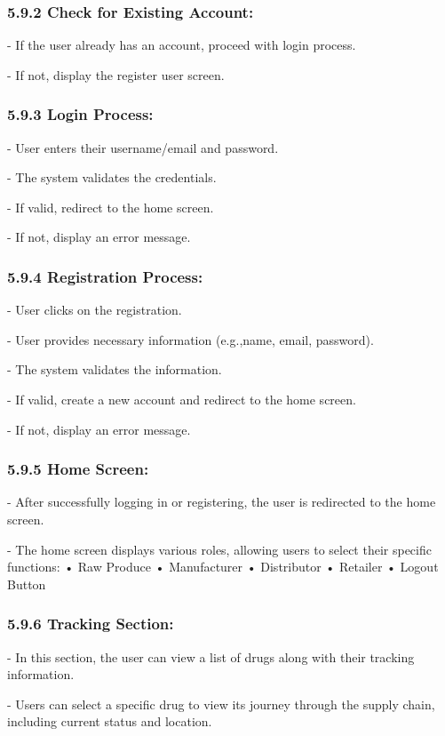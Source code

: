 \documentclass[runningheads]{llncs}
\begin{document}
\subsubsection{5.9.2 Check for Existing Account:}
- If the user already has an account, proceed with login process. 

- If not, display the register user
screen.

\subsubsection{5.9.3 Login Process:}

- User enters their username/email and password.

- The system validates the credentials.

- If valid, redirect to the home screen.

- If not, display an error message.

\subsubsection{5.9.4 Registration Process:}
- User clicks on the registration.

- User provides necessary information (e.g.,name, email, password).

- The system validates the information.

- If valid, create a new account and redirect to the home screen.

- If not, display an error message.

\subsubsection{5.9.5 Home Screen:}
- After successfully logging in or registering, the user is redirected to the home screen.

- The home screen displays various roles, allowing users to select their specific functions:
• Raw Produce
• Manufacturer
• Distributor
• Retailer
• Logout Button

\subsubsection{5.9.6 Tracking Section:}
- In this section, the user can view a list of drugs along with their tracking information.

- Users can select a specific drug to view its journey through the supply chain, including current status and location.
\end{document}
